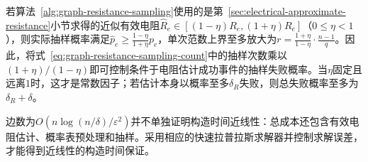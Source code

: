 若算法~\ref{alg:graph-resistance-sampling}使用的是第~\ref{sec:electrical-approximate-resistance}小节求得的近似有效电阻$\widehat R_e\in[(1-\eta)R_e,(1+\eta)R_e]$（$0\leq\eta<1$），则实际抽样概率满足$\widehat p_e\geq\frac{1-\eta}{1+\eta}p_e$，单次范数上界至多放大为$r=\frac{1+\eta}{1-\eta}\cdot\frac{n-1}{q}$。因此，将式~\eqref{eq:graph-resistance-sampling-count}中的抽样次数乘以$(1+\eta)/(1-\eta)$即可控制条件于电阻估计成功事件的抽样失败概率。当$\eta$固定且远离$1$时，这才是常数因子；若估计本身以概率至多$\delta_R$失败，则总失败概率至多为$\delta_R+\delta$。

边数为$O(n\log(n/\delta)/\varepsilon^2)$并不单独证明构造时间近线性：总成本还包含有效电阻估计、概率表预处理和抽样。采用相应的快速拉普拉斯求解器并控制求解误差，才能得到近线性的构造时间保证。
